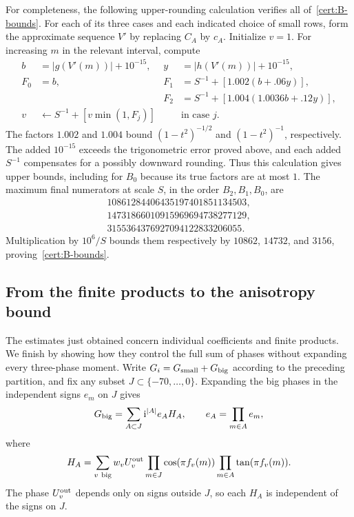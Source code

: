 For completeness, the following upper-rounding calculation verifies
all of~\eqref{cert:B-bounds}.  For each of its three cases and each
indicated choice of small rows, form the approximate sequence $V'$
by replacing $C_A$ by $c_A$.  Initialize $v=1$.  For increasing $m$
in the relevant interval, compute
\begin{align*}
 b&=|g(V'(m))|+10^{-15},& y&=|h(V'(m))|+10^{-15},\\
 F_0&=b,&
 F_1&=S^{-1}+[1.002(b+.06y)],\\
 &&F_2&=S^{-1}+[1.004(1.0036b+.12y)],\\
 v&\leftarrow S^{-1}+[v\min(1,F_j)]&&\text{in case }j.
\end{align*}
The factors $1.002$ and $1.004$ bound
$(1-t^2)^{-1/2}$ and $(1-t^2)^{-1}$, respectively.  The added
$10^{-15}$ exceeds the trigonometric error proved above, and each
added $S^{-1}$ compensates for a possibly downward rounding.
Thus this calculation gives upper bounds, including for $B_0$
because its true factors are at most $1$.  The maximum final
numerators at scale $S$, in the order $B_2,B_1,B_0$, are
\begin{equation}\label{cert:B-output}
 \begin{gathered}
 10861284406435197401851134503,\\
 14731866010915969694738277129,\\
 3155364376927094122833206055.
 \end{gathered}
\end{equation}
Multiplication by $10^6/S$ bounds them respectively by $10862$,
$14732$, and $3156$, proving~\eqref{cert:B-bounds}.

\subsection{From the finite products to the anisotropy bound}
\label{cert:walsh}

The estimates just obtained concern individual coefficients and
finite products.  We finish by showing how they control the full
sum of phases without expanding every three-phase moment.
Write $G_i=G_{\rm small}+G_{\rm big}$ according to the preceding
partition, and fix any subset $J\subset\{-70,\ldots,0\}$.
Expanding the big phases in the independent signs $e_m$ on $J$ gives
\begin{equation}\label{cert:walsh-expansion}
 G_{\rm big}=\sum_{A\subset J}\mathrm i^{|A|}e_AH_A,
 \qquad e_A=\prod_{m\in A}e_m,
\end{equation}
where
\[
 H_A=\sum_{v\ {\rm big}}w_vU_v^{\rm out}
       \prod_{m\in J}\cos(\pi f_v(m))
       \prod_{m\in A}\tan(\pi f_v(m)).
\]
The phase $U_v^{\rm out}$ depends only on signs outside $J$, so
each $H_A$ is independent of the signs on $J$.

